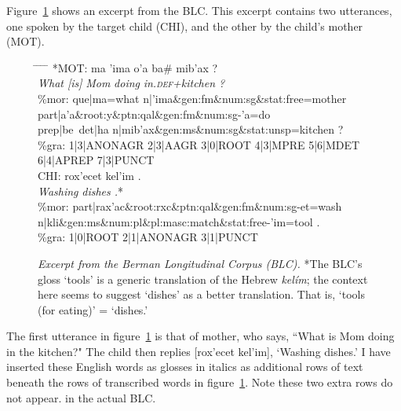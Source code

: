 Figure~\ref{fig:excerpt} shows an excerpt from the \ac{BLC}. 
This excerpt contains two utterances, one spoken by the 
target child (CHI), and the other by the child's mother (MOT).
\begin{figure}[ht]
\vspace{10pt}
\label{fig:excerpt}
\caption{\emph{Excerpt from the Berman Longitudinal Corpus (BLC).}
*The BLC's gloss `tools' is a generic translation of the Hebrew \textit{kel\'{i}m}; 
the context here seems to suggest `dishes' 
as a better translation. That is, `tools (for eating)' = `dishes.' } 
\vspace{-12pt}\begin{tabbing}
\small
\hspace{0.6in} \= \hspace{0.6in} \=  \hspace{0.5in} \= \hspace{0.6in} \= \hspace{3.4in} \kill
\textsf{*MOT:} \> \textsf{ma} \> \textsf{\a'{i}ma} \> \textsf{o\a'{a}} \>  \textsf{ba\# mib\a'{a}x ?} \\
\> \textit{What [is]} \> \textit{Mom} \> \textit{doing} \> \textit{in.\textsc{def}+kitchen ?} \\
\textsf{\%mor:} \> \textsf{que|ma=what n|\a'{i}ma\&gen:fm\&num:sg\&stat:free=mother} \\
 \> \textsf{part|a\a'{a}\&root:y\&ptn:qal\&gen:fm\&num:sg-\a'{a}=do} \\
   \> \textsf{prep|be~det|ha n|mib\a'{a}x\&gen:ms\&num:sg\&stat:unsp=kitchen ?}\\
\textsf{\%gra:} \>	\textsf{1|3|ANONAGR 2|3|AAGR 3|0|ROOT 4|3|MPRE 5|6|MDET 6|4|APREP 7|3|PUNCT}\\
\textsf{CHI:} \> \textsf{rox\a'{e}cet} \> \textsf{kel\a'{i}m .}\\
		\> \textit{Washing} \> \textit{dishes .}*  \\
\textsf{\%mor:} \> \textsf{part|rax\a'{a}c\&root:rxc\&ptn:qal\&gen:fm\&num:sg-et=wash} \\ 
    \>  \textsf{n|kli}\&\textsf{gen:ms\&num:pl\&pl:masc:match\&stat:free-\a'{i}m=tool .} \\ 
\textsf{\%gra:} \> \textsf{1|0|ROOT 2|1|ANONAGR 3|1|PUNCT}
\end{tabbing}
\end{figure}
The first utterance in figure~\ref{fig:excerpt} is that of mother,
who says, ``What is Mom doing in the kitchen?" The child
then replies \textsf{[rox\a'{e}cet kel\a'{i}m]}, `Washing dishes.' 
I have inserted these English words as glosses in italics as additional 
rows of text beneath the rows of transcribed words in figure~\ref{fig:excerpt}. 
Note these two extra rows do not appear. 
in the actual \ac{BLC}.

